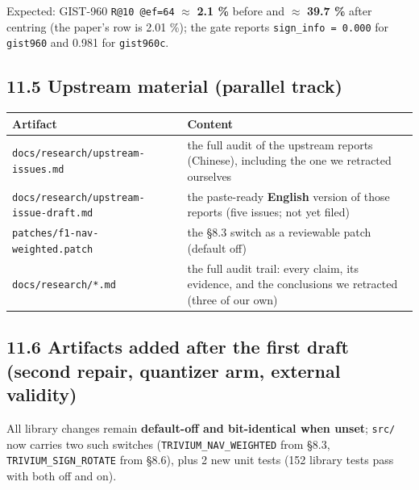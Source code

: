 \documentclass[
  10pt,
]{article}
\newcounter{none} %
\begin{document}
Expected: GIST-960 \texttt{R@10\ @ef=64} $\approx$ \textbf{2.1 \%} before and $\approx$
\textbf{39.7 \%} after centring (the paper's row is 2.01 \%); the gate
reports \texttt{sign\_info\ =\ 0.000} for \texttt{gist960} and 0.981 for
\texttt{gist960c}.

\subsection{11.5 Upstream material (parallel
track)}\label{upstream-material-parallel-track}

{\def\LTcaptype{none} %
\begin{longtable}[]{@{}
  >{\raggedright\arraybackslash}p{}
  >{\raggedright\arraybackslash}p{}@{}}
\toprule\noalign{}
\begin{minipage}[b]{\linewidth}\raggedright
Artifact
\end{minipage} & \begin{minipage}[b]{\linewidth}\raggedright
Content
\end{minipage} \\
\midrule\noalign{}
\endhead
\bottomrule\noalign{}
\endlastfoot
\texttt{docs/research/upstream-issues.md} & the full audit of the
upstream reports (Chinese), including the one we retracted ourselves \\
\texttt{docs/research/upstream-issue-draft.md} & the paste-ready
\textbf{English} version of those reports (five issues; not yet
filed) \\
\texttt{patches/f1-nav-weighted.patch} & the §8.3 switch as a reviewable
patch (default off) \\
\texttt{docs/research/*.md} & the full audit trail: every claim, its
evidence, and the conclusions we retracted (three of our own) \\
\end{longtable}
}

\subsection{11.6 Artifacts added after the first draft (second repair,
quantizer arm, external
validity)}\label{artifacts-added-after-the-first-draft-second-repair-quantizer-arm-external-validity}

All library changes remain \textbf{default-off and bit-identical when
unset}; \texttt{src/} now carries two such switches
(\texttt{TRIVIUM\_NAV\_WEIGHTED} from §8.3,
\texttt{TRIVIUM\_SIGN\_ROTATE} from §8.6), plus 2 new unit tests (152
library tests pass with both off and on).
\end{document}
